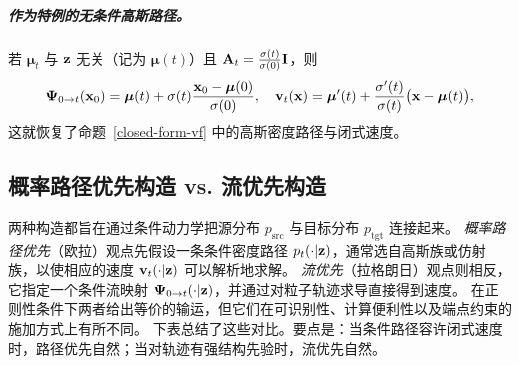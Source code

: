\subparagraph{作为特例的无条件高斯路径。}
若 $\bm{\mu}_t$ 与 ${\mathbf{z}}$ 无关（记为 $\bm{\mu}(t)$）且
${\mathbf{A}}_t = \tfrac{\sigma(t)}{\sigma(0)} {\mathbf{I}}$，则
\[
{\bm{\Psi}}_{0\to t}({\mathbf{x}}_0)=\bm\mu(t)+\sigma(t) \frac{{\mathbf{x}}_0-\bm\mu(0)}{\sigma(0)},
\quad
{\mathbf{v}}_t({\mathbf{x}})=\bm\mu'(t)+\frac{\sigma'(t)}{\sigma(t)}\bigl({\mathbf{x}}-\bm\mu(t)\bigr),
\]
这就恢复了命题~\ref{closed-form-vf} 中的高斯密度路径与闭式速度。






\subsection{概率路径优先构造 vs. 流优先构造}

两种构造都旨在通过条件动力学把源分布 $p_{\mathrm{src}}$ 与目标分布 $p_{\mathrm{tgt}}$ 连接起来。
\emph{概率路径优先}（欧拉）观点先假设一条条件密度路径 $p_t(\cdot|{\mathbf{z}})$，通常选自高斯族或仿射族，以使相应的速度 ${\mathbf{v}}_t(\cdot|{\mathbf{z}})$ 可以解析地求解。
\emph{流优先}（拉格朗日）观点则相反，它指定一个条件流映射 ${\bm{\Psi}}_{0\to t}(\cdot|{\mathbf{z}})$，并通过对粒子轨迹求导直接得到速度。
在正则性条件下两者给出等价的输运，但它们在可识别性、计算便利性以及端点约束的施加方式上有所不同。
下表总结了这些对比。要点是：当条件路径容许闭式速度时，路径优先自然；当对轨迹有强结构先验时，流优先自然。

